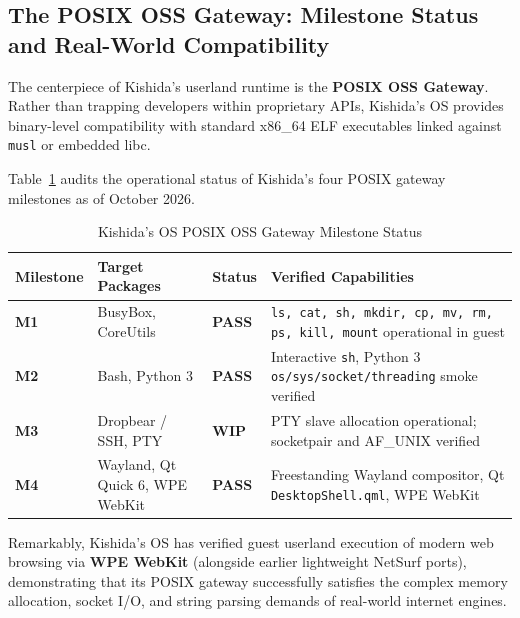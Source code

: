\documentclass[10pt,journal,compsoc,twocolumn]{article}
\begin{document}
\subsection{The POSIX OSS Gateway: Milestone Status and Real-World Compatibility}
The centerpiece of Kishida's userland runtime is the \textbf{POSIX OSS Gateway}. Rather than trapping developers within proprietary APIs, Kishida's OS provides binary-level compatibility with standard x86\_64 ELF executables linked against \texttt{musl} or embedded libc.

Table~\ref{tab:posix_audit} audits the operational status of Kishida's four POSIX gateway milestones as of October 2026.

\begin{table}[htbp]
\centering
\caption{Kishida's OS POSIX OSS Gateway Milestone Status}
\label{tab:posix_audit}
\scriptsize
\setlength{\tabcolsep}{4pt}
\renewcommand{\arraystretch}{1.15}
\begin{tabularx}{\columnwidth}{@{} l >{\raggedright\arraybackslash}p{2.8cm} l X @{}}
\toprule
Milestone & Target Packages & Status & Verified Capabilities \\
\midrule
\textbf{M1} & BusyBox, CoreUtils & \textbf{PASS} & \texttt{ls, cat, sh, mkdir, cp, mv, rm, ps, kill, mount} operational in guest \\
\textbf{M2} & Bash, Python 3 & \textbf{PASS} & Interactive \texttt{sh}, Python 3 \texttt{os/sys/socket/threading} smoke verified \\
\textbf{M3} & Dropbear / SSH, PTY & \textbf{WIP} & PTY slave allocation operational; socketpair and AF\_UNIX verified \\
\textbf{M4} & Wayland, Qt Quick 6, WPE WebKit & \textbf{PASS} & Freestanding Wayland compositor, Qt \texttt{DesktopShell.qml}, WPE WebKit \\
\bottomrule
\end{tabularx}
\end{table}

Remarkably, Kishida's OS has verified guest userland execution of modern web browsing via \textbf{WPE WebKit} (alongside earlier lightweight NetSurf ports), demonstrating that its POSIX gateway successfully satisfies the complex memory allocation, socket I/O, and string parsing demands of real-world internet engines.
\end{document}
